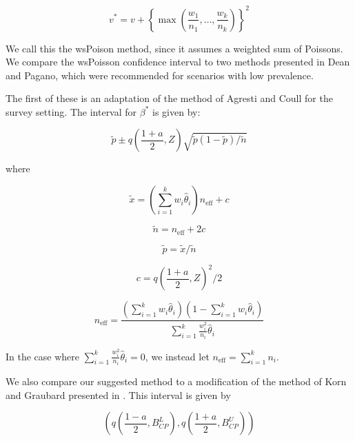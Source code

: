 \documentclass[AMA,STIX1COL]{WileyNJD-v2}
\begin{document}
\begin{equation*}
    v^* = v + \left\{ \max\left(\frac{w_1}{n_1}, \ldots, \frac{w_k}{n_k} \right) \right\}^2
\end{equation*}

We call this the wsPoison method, since it assumes a weighted sum of Poissons.
We compare the wsPoisson confidence interval to two methods presented in Dean and Pagano\cite{Dean:2015}, which were recommended for scenarios with low prevalence.

The first of these is an adaptation of the method of Agresti and Coull\cite{AgrestiCoull} for the survey setting.
The interval for \( \beta^* \) is given by:

\begin{equation}
    \tilde{p} \pm q\left( \frac{1 + a}{2}, Z \right) \sqrt{\tilde{p}(1 - \tilde{p}) / \tilde{n}}
\end{equation}

where 

\begin{equation*}
   \tilde{x} = \left( \sum_{i=1}^k w_i \hat{\theta}_i \right) n_{\text{eff}} + c 
\end{equation*}

\begin{equation*}
   \tilde{n} = n_{\text{eff}} + 2c 
\end{equation*}

\begin{equation*}
    \tilde{p} = \tilde{x} / \tilde{n}
\end{equation*}

\begin{equation*}
   c = q\left( \frac{1 + a}{2}, Z \right)^2/2
\end{equation*}

\begin{equation}
   n_{\text{eff}} = \frac{\left( \sum_{i=1}^k w_i \hat{\theta}_i \right) \left(1 - \sum_{i=1}^k w_i \hat{\theta}_i \right)}{\sum_{i=1}^k \frac{w_i^2}{n_i}\hat{\theta}_i} 
   \label{eq:neff}
\end{equation}
 
In the case where \( \sum_{i=1}^k \frac{w_i^2}{n_i}\hat{\theta}_i = 0 \), we instead let \( n_{\text{eff}} = \sum_{i=1}^k n_i \).

We also compare our suggested method to a modification of the method of Korn and Graubard\cite{Korn:1998} presented in \cite{Dean:2015}.
This interval is given by 

\begin{equation}
    \left( q \left( \frac{1 - a}{2}, B^L_{CP} \right), q \left( \frac{1 + a}{2}, B^U_{CP} \right)  \right)
\end{equation}
\end{document}
